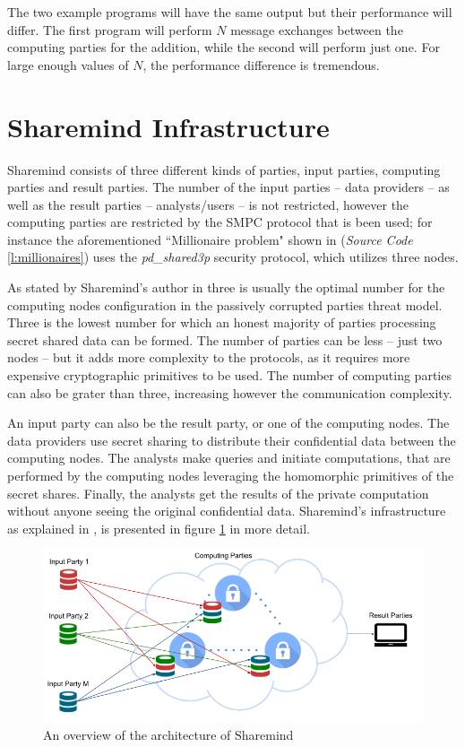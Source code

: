 The two example programs will have the same output but their performance will differ.
The first program will perform $N$ message exchanges between the computing parties for the addition, while the second will perform just one.
For large enough values of $N$, the performance difference is tremendous.



\section{Sharemind Infrastructure}\label{sharemind-infrastructure}
Sharemind consists of three different kinds of parties, input parties, computing parties and result parties.
The number of the input parties -- data providers -- as well as the result parties -- analysts/users -- is not restricted, however the computing parties are restricted by the SMPC protocol that is been used; for instance the aforementioned ``Millionaire problem" shown in (\textit{Source Code} \ref{l:millionaires}) uses the \textit{pd\_shared3p} security protocol, which utilizes three nodes.

As stated by Sharemind's author in \cite{bogdanov2013sharemind} three is usually the optimal number for the computing nodes configuration in the passively corrupted parties threat model.
Three is the lowest number for which an honest majority of parties processing secret shared data can be formed.
The number of parties can be less -- just two nodes -- but it adds more complexity to the protocols, as it requires more expensive cryptographic primitives to be used.
The number of computing parties can also be grater than three, increasing however the communication complexity.

An input party can also be the result party, or one of the computing nodes.
The data providers use secret sharing to distribute their confidential data between the computing nodes.
The analysts make queries and initiate computations, that are performed by the computing nodes leveraging the homomorphic primitives of the secret shares.
Finally, the analysts get the results of the private computation without anyone seeing the original confidential data.
Sharemind's infrastructure as explained in \cite{turban2014secure}, is presented in figure \ref{f:sharemind} in more detail.


\begin{figure}[th]
  \centering
  \includegraphics[width=\linewidth]{figures/sharemind_infrastructure.png}
  \caption{An overview of the architecture of Sharemind}\label{f:sharemind}
\end{figure}


